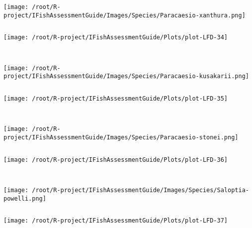 \documentclass{report}\usepackage[]{graphicx}\usepackage[]{color}
\makeatletter
\def\maxwidth{ %
  \ifdim\Gin@nat@width>\linewidth
    \linewidth
  \else
    \Gin@nat@width
  \fi
}
\newenvironment{kframe}{%
 \def\at@end@of@kframe{}%
 \ifinner\ifhmode%
  \def\at@end@of@kframe{\end{minipage}}%
  \begin{minipage}{\columnwidth}%
 \fi\fi%
 \def\FrameCommand##1{\hskip\@totalleftmargin \hskip-\fboxsep
 \colorbox{shadecolor}{##1}\hskip-\fboxsep
     \hskip-\linewidth \hskip-\@totalleftmargin \hskip\columnwidth}%
 \MakeFramed {\advance\hsize-\width
   \@totalleftmargin\z@ \linewidth\hsize
   \@setminipage}}%
 {\par\unskip\endMakeFramed%
 \at@end@of@kframe}
\newenvironment{knitrout}{}{} %
\makeatother
\begin{document}
\begin{knitrout}
\begin{kframe}
\begin{verbatim}
\end{verbatim}
\end{kframe}
\texttt{[image: /root/R-project/IFishAssessmentGuide/Images/Species/Paracaesio-xanthura.png]}
\begin{kframe}\begin{verbatim}
\end{verbatim}
\end{kframe}
\texttt{[image: /root/R-project/IFishAssessmentGuide/Plots/plot-LFD-34]} 
\begin{kframe}\begin{verbatim}
 
\end{verbatim}
\end{kframe}
\texttt{[image: /root/R-project/IFishAssessmentGuide/Images/Species/Paracaesio-kusakarii.png]}
\begin{kframe}\begin{verbatim}
\end{verbatim}
\end{kframe}
\texttt{[image: /root/R-project/IFishAssessmentGuide/Plots/plot-LFD-35]} 
\begin{kframe}\begin{verbatim}
 
\end{verbatim}
\end{kframe}
\texttt{[image: /root/R-project/IFishAssessmentGuide/Images/Species/Paracaesio-stonei.png]}
\begin{kframe}\begin{verbatim}
\end{verbatim}
\end{kframe}
\texttt{[image: /root/R-project/IFishAssessmentGuide/Plots/plot-LFD-36]} 
\begin{kframe}\begin{verbatim}
 
\end{verbatim}
\end{kframe}
\texttt{[image: /root/R-project/IFishAssessmentGuide/Images/Species/Saloptia-powelli.png]}
\begin{kframe}\begin{verbatim}
\end{verbatim}
\end{kframe}
\texttt{[image: /root/R-project/IFishAssessmentGuide/Plots/plot-LFD-37]} 
\begin{kframe}\begin{verbatim}
 

\end{verbatim}
\end{kframe}
\end{knitrout}
\end{document}
